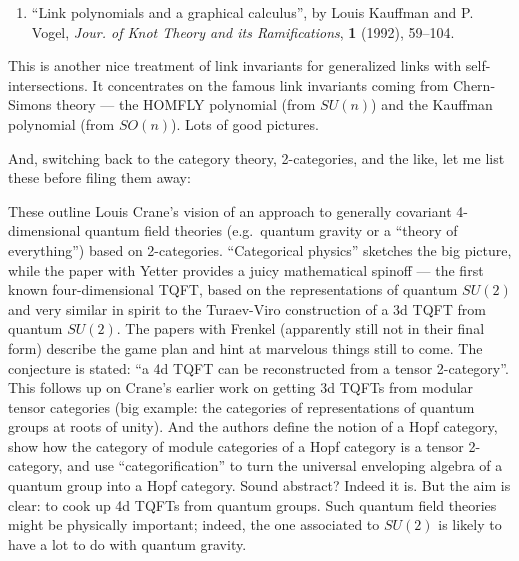 \documentclass{article}
\def\tightlist{}
\renewcommand{\texttt}[1]{%
  \begingroup
  \ttfamily
  \begingroup\lccode`~=`/\lowercase{\endgroup\def~}{/\discretionary{}{}{}}%
  \begingroup\lccode`~=`[\lowercase{\endgroup\def~}{[\discretionary{}{}{}}%
  \begingroup\lccode`~=`.\lowercase{\endgroup\def~}{.\discretionary{}{}{}}%
  \catcode`/=\active\catcode`[=\active\catcode`.=\active
  \scantokens{#1\noexpand}%
  \endgroup
}
\begin{document}
\begin{enumerate}
\def\labelenumi{\arabic{enumi})}
\setcounter{enumi}{2}
\tightlist
\item
  ``Link polynomials and a graphical calculus'', by Louis Kauffman and
  P. Vogel, \emph{Jour. of Knot Theory and its Ramifications},
  \textbf{1} (1992), 59--104.
\end{enumerate}

This is another nice treatment of link invariants for generalized links
with self-intersections. It concentrates on the famous link invariants
coming from Chern-Simons theory --- the HOMFLY polynomial (from
\(SU(n)\)) and the Kauffman polynomial (from \(SO(n)\)). Lots of good
pictures.

And, switching back to the category theory, 2-categories, and the like,
let me list these before filing them away:


These outline Louis Crane's vision of an approach to generally covariant
4-dimensional quantum field theories (e.g.~quantum gravity or a ``theory
of everything'') based on 2-categories. ``Categorical physics'' sketches
the big picture, while the paper with Yetter provides a juicy
mathematical spinoff --- the first known four-dimensional TQFT, based on
the representations of quantum \(SU(2)\) and very similar in spirit to
the Turaev-Viro construction of a 3d TQFT from quantum \(SU(2)\). The
papers with Frenkel (apparently still not in their final form) describe
the game plan and hint at marvelous things still to come. The conjecture
is stated: ``a 4d TQFT can be reconstructed from a tensor 2-category''.
This follows up on Crane's earlier work on getting 3d TQFTs from modular
tensor categories (big example: the categories of representations of
quantum groups at roots of unity). And the authors define the notion of
a Hopf category, show how the category of module categories of a Hopf
category is a tensor 2-category, and use ``categorification'' to turn
the universal enveloping algebra of a quantum group into a Hopf
category. Sound abstract? Indeed it is. But the aim is clear: to cook up
4d TQFTs from quantum groups. Such quantum field theories might be
physically important; indeed, the one associated to \(SU(2)\) is likely
to have a lot to do with quantum gravity.
\end{document}
